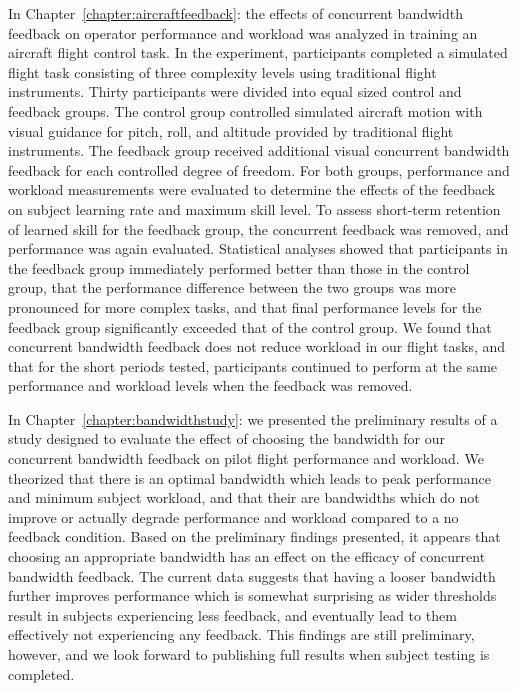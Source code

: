 In Chapter~\ref{chapter:aircraftfeedback}:  the effects of concurrent bandwidth feedback on operator performance and workload was analyzed in training an aircraft flight control task.
In the experiment, participants completed a simulated flight task consisting of three complexity levels using traditional flight instruments.
Thirty participants were divided into equal sized control and feedback groups.
The control group controlled simulated aircraft motion with visual guidance for pitch, roll, and altitude provided by traditional flight instruments.
The feedback group received additional visual concurrent bandwidth feedback for each controlled degree of freedom.
For both groups, performance and workload measurements were evaluated to determine the effects of the feedback on subject learning rate and maximum skill level.
To assess short-term retention of learned skill for the feedback group, the concurrent feedback was removed, and performance was again evaluated.
Statistical analyses showed that participants in the feedback group immediately performed better than those in the control group, that the performance difference between the two groups was more pronounced for more complex tasks, and that final performance levels for the feedback group significantly exceeded that of the control group.
We found that concurrent bandwidth feedback does not reduce workload in our flight tasks, and that for the short periods tested, participants continued to perform at the same performance and workload levels when the feedback was removed.

In Chapter~\ref{chapter:bandwidthstudy}:  we presented the preliminary results of a study designed to evaluate the effect of choosing the bandwidth for our concurrent bandwidth feedback on pilot flight performance and workload.
We theorized that there is an optimal bandwidth which leads to peak performance and minimum subject workload, and that their are bandwidths which do not improve or actually degrade performance and workload compared to a no feedback condition.
Based on the preliminary findings presented, it appears that choosing an appropriate bandwidth has an effect on the efficacy of concurrent bandwidth feedback.
The current data suggests that having a looser bandwidth further improves performance which is somewhat surprising as wider thresholds result in subjects experiencing less feedback, and eventually lead to them effectively not experiencing any feedback.
This findings are still preliminary, however, and we look forward to publishing full results when subject testing is completed.

